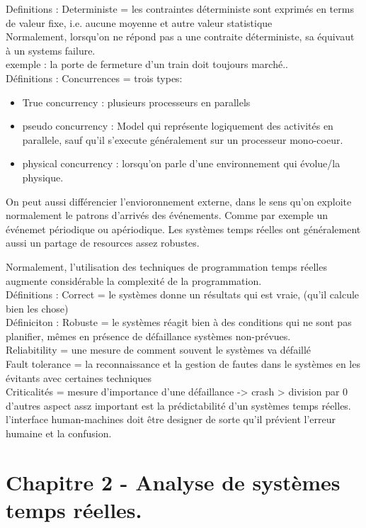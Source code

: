 \documentclass[oneside]{book}
\begin{document}
    Definitions : Deterministe = les contraintes déterministe sont exprimés en terms de valeur fixe, i.e. aucune moyenne et autre valeur statistique\\
    
    Normalement, lorsqu'on ne répond pas a une contraite déterministe, sa équivaut à un systems failure.\\
    
    exemple : la porte de fermeture d'un train doit toujours marché..\\
    
    Définitions : Concurrences  = trois types:
    \begin{itemize}
        \item True concurrency : plusieurs processeurs en parallels
        \item pseudo concurrency : Model qui représente logiquement des activités en parallele, sauf qu'il s'execute généralement sur un processeur mono-coeur.
        \item physical concurrency : lorsqu'on parle d'une environnement qui évolue/la physique.
    \end{itemize}
    On peut aussi différencier l'envioronnement externe, dans le sens qu'on exploite normalement le patrons d'arrivés des événements. Comme par exemple un événemet périodique ou apériodique. Les systèmes temps réelles ont généralement aussi un partage de resources assez robustes.
    
    Normalement, l'utilisation des techniques de programmation temps réelles augmente considérable la complexité de la programmation.\\
    
    Définitions : Correct = le systèmes donne un résultats qui est vraie, (qu'il calcule bien les chose)\\
    
    Définiciton : Robuste = le systèmes réagit bien à des conditions qui ne sont pas planifier, mêmes en présence de défaillance systèmes non-prévues.\\
    
    Reliabitility  = une mesure de comment souvent le systèmes va défaillé\\
    
    Fault tolerance  = la reconnaissance et la gestion de fautes dans le systèmes en les évitants avec certaines techniques\\
    
    Criticalités = mesure d'importance d'une défaillance -> crash > division par 0\\
    
    d'autres aspect assz important est la prédictabilité d'un systèmes temps réelles. l'interface human-machines doit être designer de sorte qu'il prévient l'erreur humaine et la confusion.\\
    
    \chapter{Chapitre 2 - Analyse de systèmes temps réelles.}
     
    
\end{document}
